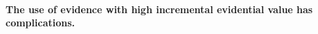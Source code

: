\documentclass[10pt]{article}
\begin{document}


\paragraph{The use of evidence with high incremental evidential value has complications.}
\end{document}
